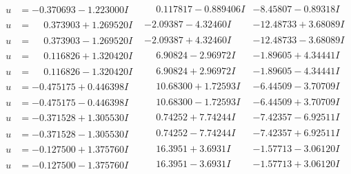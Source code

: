 \documentclass[1p]{elsarticle_modified}
\theoremstyle{definition}
\begin{document}
$$\begin{array}{c|c|c}
\begin{aligned}
u &= -0.370693 - 1.223000 I\end{aligned}
 & \phantom{-}0.117817 - 0.889406 I & -8.45807 - 0.89318 I \\ \hline\begin{aligned}
u &= \phantom{-}0.373903 + 1.269520 I\end{aligned}
 & -2.09387 - 4.32460 I & -12.48733 + 3.68089 I \\ \hline\begin{aligned}
u &= \phantom{-}0.373903 - 1.269520 I\end{aligned}
 & -2.09387 + 4.32460 I & -12.48733 - 3.68089 I \\ \hline\begin{aligned}
u &= \phantom{-}0.116826 + 1.320420 I\end{aligned}
 & \phantom{-}6.90824 - 2.96972 I & -1.89605 + 4.34441 I \\ \hline\begin{aligned}
u &= \phantom{-}0.116826 - 1.320420 I\end{aligned}
 & \phantom{-}6.90824 + 2.96972 I & -1.89605 - 4.34441 I \\ \hline\begin{aligned}
u &= -0.475175 + 0.446398 I\end{aligned}
 & \phantom{-}10.68300 + 1.72593 I & -6.44509 - 3.70709 I \\ \hline\begin{aligned}
u &= -0.475175 - 0.446398 I\end{aligned}
 & \phantom{-}10.68300 - 1.72593 I & -6.44509 + 3.70709 I \\ \hline\begin{aligned}
u &= -0.371528 + 1.305530 I\end{aligned}
 & \phantom{-}0.74252 + 7.74244 I & -7.42357 - 6.92511 I \\ \hline\begin{aligned}
u &= -0.371528 - 1.305530 I\end{aligned}
 & \phantom{-}0.74252 - 7.74244 I & -7.42357 + 6.92511 I \\ \hline\begin{aligned}
u &= -0.127500 + 1.375760 I\end{aligned}
 & \phantom{-}16.3951 + 3.6931 I & -1.57713 - 3.06120 I \\ \hline\begin{aligned}
u &= -0.127500 - 1.375760 I\end{aligned}
 & \phantom{-}16.3951 - 3.6931 I & -1.57713 + 3.06120 I \\ \hline\begin{aligned}

\end{aligned}
\end{array}$$
\end{document}
